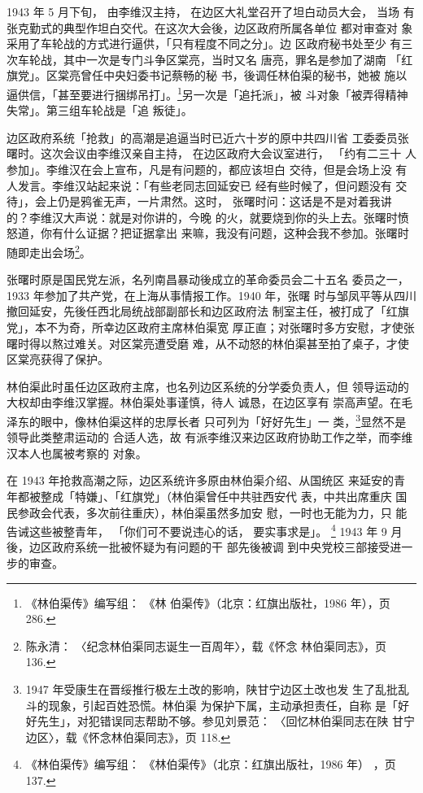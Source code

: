 
1943 年 5 月下旬， 由李维汉主持， 在边区大礼堂召开了坦白动员大会， 当场
有张克勤式的典型作坦白交代。在这次大会後，边区政府所属各单位 都对审查对
象采用了车轮战的方式进行逼供，「只有程度不同之分」。边 区政府秘书处至少
有三次车轮战，其中一次是专门斗争区棠亮，当时又名 唐亮，罪名是参加了湖南
「红旗党」。区棠亮曾任中央妇委书记蔡畅的秘 书，後调任林伯渠的秘书，她被
施以逼供信，「甚至要进行捆绑吊打」。\footnote{《林伯渠传》编写组： 《林
伯渠传》（北京：红旗出版社，1986 年），页 286.}另一次是「追托派」，被
斗对象「被弄得精神失常」。第三组车轮战是「追 叛徒」。

边区政府系统「抢救」的高潮是追逼当时已近六十岁的原中共四川省 工委委员张
曙时。这次会议由李维汉亲自主持， 在边区政府大会议室进行， 「约有二三十
人参加」。李维汉在会上宣布，凡是有问题的，都应该坦白 交待，但是会场上没
有人发言。李维汉站起来说：「有些老同志回延安已 经有些时候了，但问题没有
交待」，会上仍是鸦雀无声，一片肃然。这时， 张曙时问：这话是不是对着我讲
的？李维汉大声说：就是对你讲的，今晚 的火，就要烧到你的头上去。张曙时愤
怒道，你有什么证据？把证据拿出 来嘛，我没有问题，这种会我不参加。张曙时
随即走出会场\footnote{陈永清： 〈纪念林伯渠同志诞生一百周年〉，载《怀念
林伯渠同志》，页 136.}。

张曙时原是国民党左派，名列南昌暴动後成立的革命委员会二十五名
委员之一，1933 年参加了共产党，在上海从事情报工作。1940 年，张曙
时与邹凤平等从四川撤回延安，先後任西北局统战部副部长和边区政府法
制室主任，被打成了「红旗党」，本不为奇，所幸边区政府主席林伯渠宽
厚正直；对张曙时多方安慰，才使张曙时得以熬过难关。对区棠亮遭受磨
难，从不动怒的林伯渠甚至拍了桌子，才使区棠亮获得了保护。

林伯渠此时虽任边区政府主席，也名列边区系统的分学委负责人，但 领导运动的
大权却由李维汉掌握。林伯渠处事谨慎，待人 诚恳，在边区享有
崇高声望。在毛泽东的眼中，像林伯渠这样的忠厚长者 只可列为「好好先生」一
类，\footnote{1947 年受康生在晋绥推行极左土改的影响，陕甘宁边区土改也发
生了乱批乱斗的现象，引起百姓恐慌。林伯渠 为保护下属，主动承担责任，自称
是「好好先生」，对犯错误同志帮助不够。参见刘景范： 〈回忆林伯渠同志在陕
甘宁 边区〉，载《怀念林伯渠同志》，页 118.}显然不是领导此类整肃运动的
合适人选，故 有派李维汉来边区政府协助工作之举，而李维汉本人也属被考察的
对象。
 
在 1943 年抢救高潮之际，边区系统许多原由林伯渠介绍、从国统区 来延安的青
年都被整成「特嫌」、「红旗党」（林伯渠曾任中共驻西安代 表，中共出席重庆
国民参政会代表，多次前往重庆），林伯渠虽然多加安 慰，一时也无能为力，只
能告诫这些被整青年， 「你们可不要说违心的话， 要实事求是」。
\footnote{《林伯渠传》编写组： 《林伯渠传》（北京：红旗出版社，1986 年）
，页 137.} 1943 年 9 月後，边区政府系统一批被怀疑为有问题的干 部先後被调
到中央党校三部接受进一步的审查。

